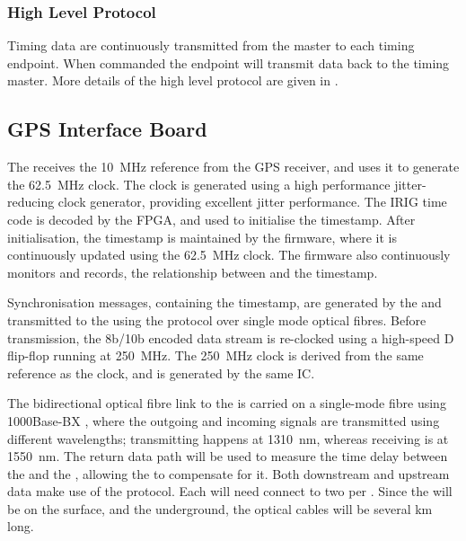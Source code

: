 \documentclass[main.tex]{subfiles}
\begin{document}
\subsubsection{High Level Protocol}

Timing data are continuously transmitted from the master to each timing endpoint. When commanded the endpoint will transmit data back to the timing master. More details of the high level protocol are given in \cite{ref:dts_high_level_protocol}.

\subsection{GPS Interface Board}
The  receives the \SI{10}{\MHz} reference from the GPS receiver, and uses it to generate the \SI{62.5}{\MHz}  clock. The clock is generated using a high performance jitter-reducing clock generator, providing excellent jitter performance. The IRIG time code is decoded by the  FPGA, and used to initialise the  timestamp. After initialisation, the  timestamp is maintained by the  firmware, where it is continuously updated using the \SI{62.5}{\MHz} clock. The firmware also continuously monitors and records, the relationship between  and the  timestamp.

Synchronisation messages, containing the  timestamp, are generated by the  and transmitted to the  using the  protocol over single mode optical fibres. Before transmission, the 8b/10b encoded  data stream is re-clocked using a high-speed D flip-flop running at \SI{250}{\MHz}. The \SI{250}{\MHz} clock is derived from the same reference as the  clock, and is generated by the same IC.

The bidirectional optical fibre link to the  is carried on a single-mode fibre using 1000Base-BX , where the outgoing and incoming signals are transmitted using different wavelengths; transmitting happens at \SI{1310}{nm}, whereas receiving is at \SI{1550}{nm}. The return data path will be used to measure the time delay between the  and the , allowing the  to compensate for it. Both downstream and upstream data make use of the  protocol. Each  will need connect to two  per . Since the  will be on the surface, and the  underground, the optical cables will be several km long.
\end{document}
